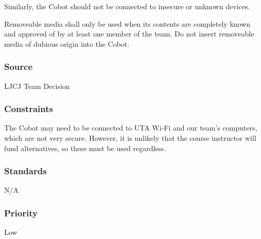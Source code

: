 Similarly, the Cobot should not be connected to insecure or unknown devices.

Removeable media shall only be used when its contents are completely known and approved of by at least one member of the team. Do not insert removeable media of dubious origin into the Cobot. 
\subsubsection{Source}
LJCJ Team Decision
\subsubsection{Constraints}
The Cobot may need to be connected to UTA Wi-Fi and our team's computers, which are not very secure. However, it is unlikely that the course instructor will fund alternatives, so these must be used regardless. 
\subsubsection{Standards}
N/A
\subsubsection{Priority}
Low